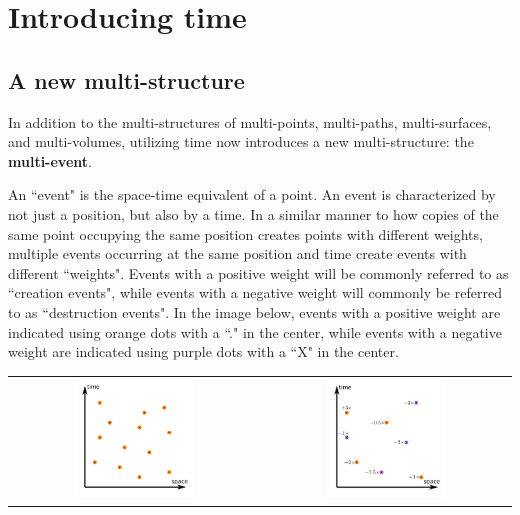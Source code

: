 


\chapter{Introducing time}




\section{A new multi-structure}

In addition to the multi-structures of multi-points, multi-paths, multi-surfaces, and multi-volumes, utilizing time now introduces a new multi-structure: the {\bf multi-event}. 

An ``event" is the space-time equivalent of a point. An event is characterized by not just a position, but also by a time. In a similar manner to how copies of the same point occupying the same position creates points with different weights, multiple events occurring at the same position and time create events with different ``weights". Events with a positive weight will be commonly referred to as ``creation events", while events with a negative weight will commonly be referred to as ``destruction events". In the image below, events with a positive weight are indicated using orange dots with a ``." in the center, while events with a negative weight are indicated using purple dots with a ``X" in the center. 

\begin{center}
\begin{tabular}{cc}
\includegraphics[width = 0.5\textwidth]{Time/multi-event_simple} & 
\includegraphics[width = 0.5\textwidth]{Time/multi-event_multiplicity}
\end{tabular}
\end{center}





